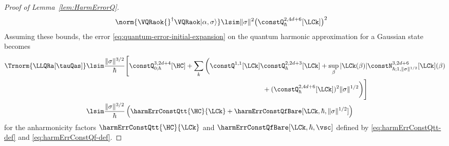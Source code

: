 \documentclass{article}
\numberwithin{equation}{section}
\begin{document}
\begin{proof}[Proof of Lemma~\ref{lem:HarmErrorQ}]
\begin{align}
\begin{split}
			\norm{ \VQRaok{}^\dagger \VQRaok |\alpha,\sigma \rangle}
			&\lsim
			\|\sigma\|^2
            \big(\constQ^{2,4d+6}_{\hbar}[\LCk]\big)^2
		\end{split}
	\end{align}
	Assuming these bounds, 
	the error \eqref{eq:quantum-error-initial-expansion} on the quantum harmonic approximation for a Gaussian state becomes
	\begin{align}\begin{split}\label{eq:quantum-error-bound}
			\Trnorm{ \LLQRa[\tauQas] }  
            & \lsim
			\frac{\|\sigma\|^{3/2}}{\hbar}
            \Bigg[
			\constQ^{3,2d+4}_{0;\hbar}[\HC]
			+ \sum_k
			\bigg(
            \constQ^{1,1}[\LCk]
			\constQ^{2,2d+3}_{\hbar}[\LCk]
            +
			\sup_{\beta} |\LCk(\beta)| 
   \constN^{3,2d+6}_{\hbar;1,\|\sigma\|^{1/2}}[\LCk](\beta)
            \\
            &\hspace{26em}
            +
			(\constQ^{2,4d+6}_{\hbar}[\LCk])^2 
            \|\sigma\|^{1/2}
			\bigg) 
			\Bigg]
            \\
            & \lsim
            \frac{\|\sigma\|^{3/2}}{\hbar}
            \left(\harmErrConstQtt{\HC}{\LCk} + \harmErrConstQfBare[\LCk,\hbar,\|\sigma\|^{1/2}]\right)
	\end{split}\end{align}
    for the anharmonicity factors $\harmErrConstQtt{\HC}{\LCk}$ and $\harmErrConstQfBare[\LCk,\hbar,\vsc]$ defined by \eqref{eq:harmErrConstQtt-def} and \eqref{eq:harmErrConstQf-def}.
    

\end{proof}
\end{document}
